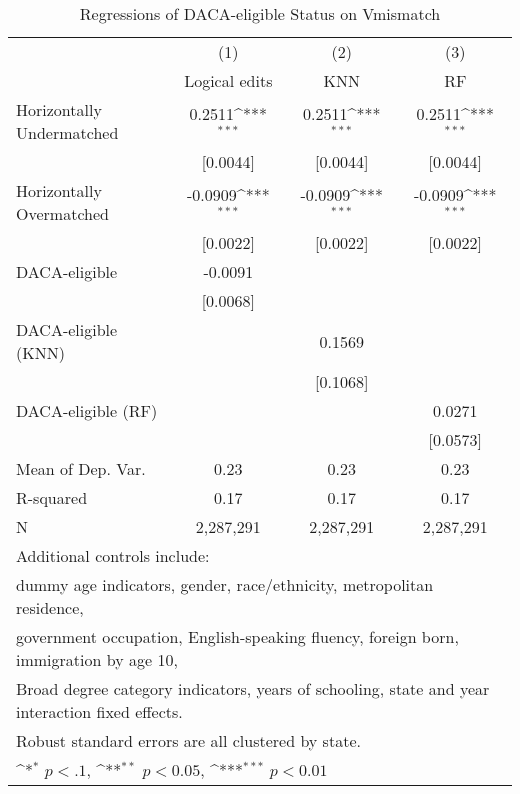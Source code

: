 \begin{table}[htbp]\centering
\def\sym#1{\ifmmode^{#1}\else\(^{#1}\)\fi}
\caption{Regressions of DACA-eligible Status on Vmismatch}
\begin{tabular}{l*{3}{c}}
\toprule
                    &\multicolumn{1}{c}{(1)}         &\multicolumn{1}{c}{(2)}         &\multicolumn{1}{c}{(3)}         \\
                    &Logical edits         &         KNN         &          RF         \\
\midrule
Horizontally Undermatched&      0.2511\sym{***}&      0.2511\sym{***}&      0.2511\sym{***}\\
                    &    [0.0044]         &    [0.0044]         &    [0.0044]         \\
\addlinespace
Horizontally Overmatched&     -0.0909\sym{***}&     -0.0909\sym{***}&     -0.0909\sym{***}\\
                    &    [0.0022]         &    [0.0022]         &    [0.0022]         \\
\addlinespace
DACA-eligible       &     -0.0091         &                     &                     \\
                    &    [0.0068]         &                     &                     \\
\addlinespace
DACA-eligible (KNN) &                     &      0.1569         &                     \\
                    &                     &    [0.1068]         &                     \\
\addlinespace
DACA-eligible (RF)  &                     &                     &      0.0271         \\
                    &                     &                     &    [0.0573]         \\
\midrule
Mean of Dep. Var.   &        0.23         &        0.23         &        0.23         \\
R-squared           &        0.17         &        0.17         &        0.17         \\
N                   &   2,287,291         &   2,287,291         &   2,287,291         \\
\bottomrule
\multicolumn{4}{l}{\footnotesize Additional controls include:}\\
\multicolumn{4}{l}{\footnotesize dummy age indicators, gender, race/ethnicity, metropolitan residence,}\\
\multicolumn{4}{l}{\footnotesize government occupation, English-speaking fluency, foreign born, immigration by age 10,}\\
\multicolumn{4}{l}{\footnotesize Broad degree category indicators, years of schooling, state and year interaction fixed effects.}\\
\multicolumn{4}{l}{\footnotesize Robust standard errors are all clustered by state.}\\
\multicolumn{4}{l}{\footnotesize \sym{*} \(p<.1\), \sym{**} \(p<0.05\), \sym{***} \(p<0.01\)}\\
\end{tabular}
\end{table}
